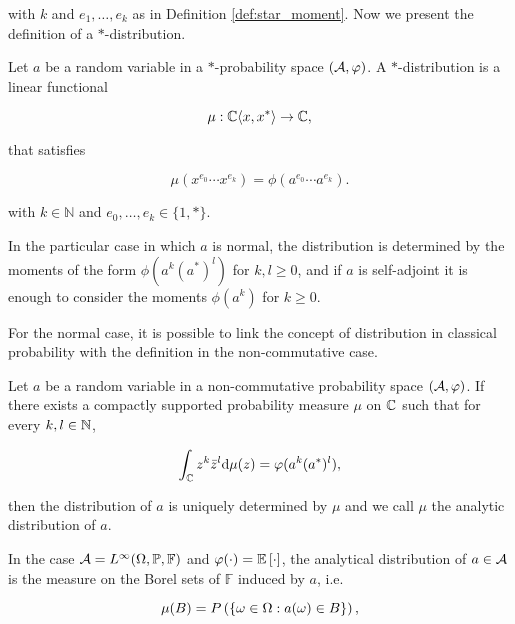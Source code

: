     \noindent with $k$ and $e_1, \dots, e_k$ as in Definition \ref{def:star_moment}. Now we present the definition of a $*$-distribution.

    \begin{definition}
        Let $a$ be a random variable in a $*$-probability space $(\A,\phi)$. A $*$-distribution is a linear functional

        \begin{equation*}
            \mu : \C\langle x, x^*\rangle \to \C,
        \end{equation*}

        \noindent that satisfies

        \begin{equation*}
            \mu(x^{e_0}\cdots x^{e_k}) = \phi(a^{e_0}\cdots a^{e_k}).
        \end{equation*}

        \noindent with $k \in \mathbb{N}$ and $e_0, \dots, e_k \in \{1,*\}$.
    \end{definition}

    In the particular case in which $a$ is normal, the distribution is determined by the moments of the form $\phi(a^k(a^*)^l)$ for $k,l \ge 0$, and if $a$ is self-adjoint it is enough to consider the moments $\phi(a^k)$ for $k\ge 0$. 
    
    For the normal case, it is possible to link the concept of distribution in classical probability with the definition in the non-commutative case.

    \begin{definition}
        Let $a$ be a random variable in a non-commutative probability space $(\A,\phi)$. If there exists a compactly supported probability measure $\mu$ on $\C$ such that for every $k,l\in \N$,

        \begin{equation*}
            \int_\C z^k \bar{z}^l \d \mu(z) = \phi(a^k(a^*)^l),
        \end{equation*}

        then the distribution of $a$ is uniquely determined by $\mu$ and we call $\mu$ the analytic distribution of $a$.
    \end{definition}

    In the case $\A = L^{\infty}(\Omega,\mathbb P, \mathbb F)$ and $\phi(\cdot) = \E{\cdot}$, the analytical distribution of $a \in \A$ is the measure on the Borel sets of $\mathbb F$ induced by $a$, i.e.

    \begin{equation*}
        \mu(B) = \P{ \{ \omega \in \Omega : a(\omega) \in B \} },
    \end{equation*}

